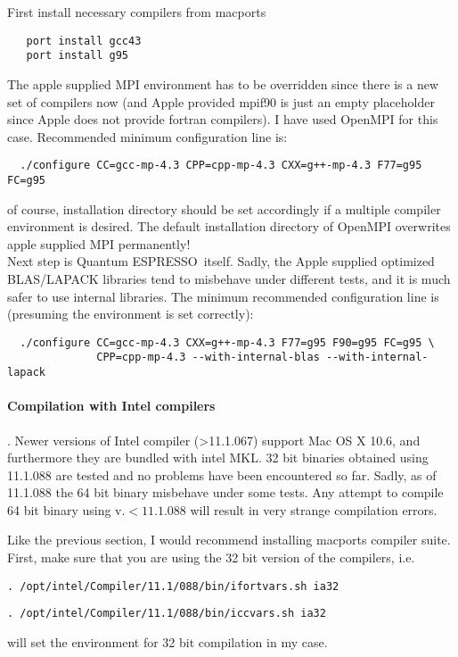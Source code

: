 \documentclass[12pt,a4paper]{article}
\def\qe{{\sc Quantum ESPRESSO}}
\begin{document}
First install necessary compilers from macports
\begin{verbatim}
   port install gcc43
   port install g95
\end{verbatim}
The apple supplied MPI environment has to be overridden since there is
a new set of compilers now (and Apple provided mpif90 is just an empty
placeholder since Apple does not provide fortran compilers). I have used
OpenMPI for this case. Recommended minimum configuration line is:
\begin{verbatim}
  ./configure CC=gcc-mp-4.3 CPP=cpp-mp-4.3 CXX=g++-mp-4.3 F77=g95 FC=g95
\end{verbatim}
of course, installation directory should be set accordingly if a multiple
compiler environment is desired. The default installation directory of
OpenMPI overwrites apple supplied MPI permanently!\\
Next step is \qe\ itself. Sadly, the Apple supplied optimized BLAS/LAPACK
libraries tend to misbehave under different tests, and it is much safer to
use internal libraries. The minimum recommended configuration
line is (presuming the environment is set correctly):
\begin{verbatim}
  ./configure CC=gcc-mp-4.3 CXX=g++-mp-4.3 F77=g95 F90=g95 FC=g95 \
              CPP=cpp-mp-4.3 --with-internal-blas --with-internal-lapack
\end{verbatim}
\paragraph{Compilation with Intel compilers}.
Newer versions of Intel compiler (>11.1.067) support Mac OS X 10.6, and furthermore they are
bundled with intel MKL. 32 bit binaries obtained using 11.1.088 are tested and no problems
have been encountered so far. Sadly, as of 11.1.088 the 64 bit binary misbehave
under some tests. Any attempt to compile 64 bit binary using v.$<11.1.088$ will result in
very strange compilation errors.

Like the previous section, I would recommend installing macports compiler suite.
First, make sure that you are using the 32 bit version of the compilers,
i.e.
\begin{verbatim}
. /opt/intel/Compiler/11.1/088/bin/ifortvars.sh ia32
\end{verbatim}
\begin{verbatim}
. /opt/intel/Compiler/11.1/088/bin/iccvars.sh ia32
\end{verbatim}
will set the environment for 32 bit compilation in my case.
\end{document}
